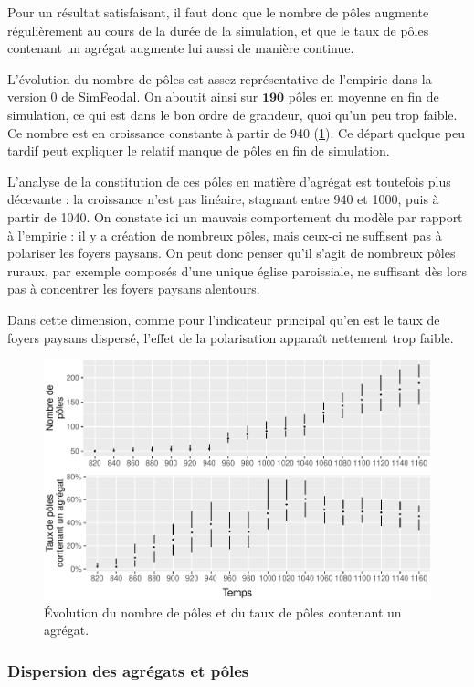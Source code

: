 Pour un résultat satisfaisant, il faut donc que le nombre de pôles augmente régulièrement au cours de la durée de la simulation, et que le taux de pôles contenant un agrégat augmente lui aussi de manière continue.

\begin{mdframed}[backgroundcolor=gray!10,footnoteinside=false]
L'évolution du nombre de pôles est assez représentative de l'empirie dans la version 0 de SimFeodal.
On aboutit ainsi sur $\textbf{190}$ pôles en moyenne en fin de simulation, ce qui est dans le bon ordre de grandeur, quoi qu'un peu trop faible.
Ce nombre est en croissance constante à partir de 940 (\cref{fig:nombre-poles-v0}).
Ce départ quelque peu tardif peut expliquer le relatif manque de pôles en fin de simulation.

L'analyse de la constitution de ces pôles en matière d'agrégat est toutefois plus décevante :
la croissance n'est pas linéaire, stagnant entre 940 et 1000, puis à partir de 1040.
On constate ici un mauvais comportement du modèle par rapport à l'empirie :
il y a création de nombreux pôles, mais ceux-ci ne suffisent pas à polariser les foyers paysans.
On peut donc penser qu'il s'agit de nombreux pôles ruraux, par exemple composés d'une unique église paroissiale, ne suffisant dès lors pas à concentrer les foyers paysans alentours.

Dans cette dimension, comme pour l'indicateur principal qu'en est le taux de foyers paysans dispersé, l'effet de la polarisation apparaît nettement trop faible.
\end{mdframed}


\begin{figure}[H]
\captionsetup{width=\linewidth}
\includegraphics[width=0.5\linewidth]{img/resultats/v0_nombre_poles.pdf}
\caption{Évolution du nombre de pôles et du taux de pôles contenant un agrégat.} 
\label{fig:nombre-poles-v0} 
\end{figure}

\clearpage

\subsubsection{Dispersion des agrégats et pôles}\label{par:polarisation-dispersion}


